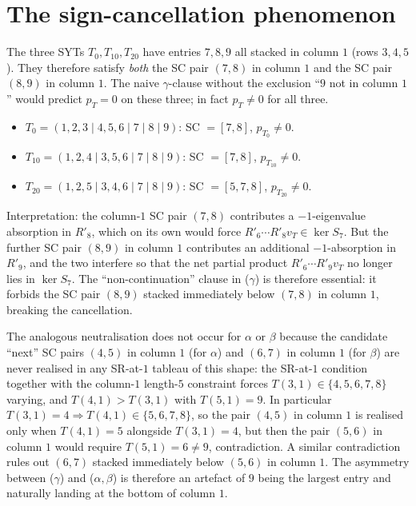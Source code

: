 \documentclass[11pt]{article}
\theoremstyle{definition}
\begin{document}
\section{The sign-cancellation phenomenon}
\label{sec:sign-cancel}

The three SYTs $T_0, T_{10}, T_{20}$ have entries $7, 8, 9$ all
stacked in column $1$ (rows $3, 4, 5$). They therefore satisfy
\emph{both} the SC pair $(7, 8)$ in column $1$ and the SC pair
$(8, 9)$ in column $1$. The naive $\gamma$-clause without the
exclusion ``$9$ not in column $1$'' would predict $p_T = 0$ on these
three; in fact $p_T \ne 0$ for all three.

\begin{itemize}
\item $T_0 = (1,2,3 \mid 4,5,6 \mid 7 \mid 8 \mid 9)$: SC $= [7, 8]$,
$p_{T_0} \ne 0$.
\item $T_{10} = (1,2,4 \mid 3,5,6 \mid 7 \mid 8 \mid 9)$: SC
$= [7, 8]$, $p_{T_{10}} \ne 0$.
\item $T_{20} = (1,2,5 \mid 3,4,6 \mid 7 \mid 8 \mid 9)$: SC
$= [5, 7, 8]$, $p_{T_{20}} \ne 0$.
\end{itemize}

Interpretation: the column-$1$ SC pair $(7, 8)$ contributes a
$-1$-eigenvalue absorption in $R'_8$, which on its own would force
$R'_6 \cdots R'_8 v_T \in \ker S_7$. But the further SC pair
$(8, 9)$ in column $1$ contributes an additional $-1$-absorption in
$R'_9$, and the two interfere so that the net partial product
$R'_6 \cdots R'_9 v_T$ no longer lies in $\ker S_7$. The
``non-continuation'' clause in ($\gamma$) is therefore essential:
it forbids the SC pair $(8, 9)$ stacked immediately below $(7, 8)$
in column $1$, breaking the cancellation.

The analogous neutralisation does not occur for $\alpha$ or $\beta$
because the candidate ``next'' SC pairs $(4, 5)$ in column $1$ (for
$\alpha$) and $(6, 7)$ in column $1$ (for $\beta$) are never realised
in any SR-at-$1$ tableau of this shape: the SR-at-$1$ condition
together with the column-$1$ length-$5$ constraint forces $T(3, 1)
\in \{4, 5, 6, 7, 8\}$ varying, and $T(4, 1) > T(3, 1)$ with $T(5, 1)
= 9$. In particular $T(3, 1) = 4 \Rightarrow T(4, 1) \in
\{5, 6, 7, 8\}$, so the pair $(4, 5)$ in column $1$ is realised only
when $T(4, 1) = 5$ alongside $T(3, 1) = 4$, but then the pair $(5,
6)$ in column $1$ would require $T(5, 1) = 6 \ne 9$, contradiction.
A similar contradiction rules out $(6, 7)$ stacked immediately below
$(5, 6)$ in column $1$. The asymmetry between ($\gamma$) and
($\alpha, \beta$) is therefore an artefact of $9$ being the largest
entry and naturally landing at the bottom of column $1$.
\end{document}
